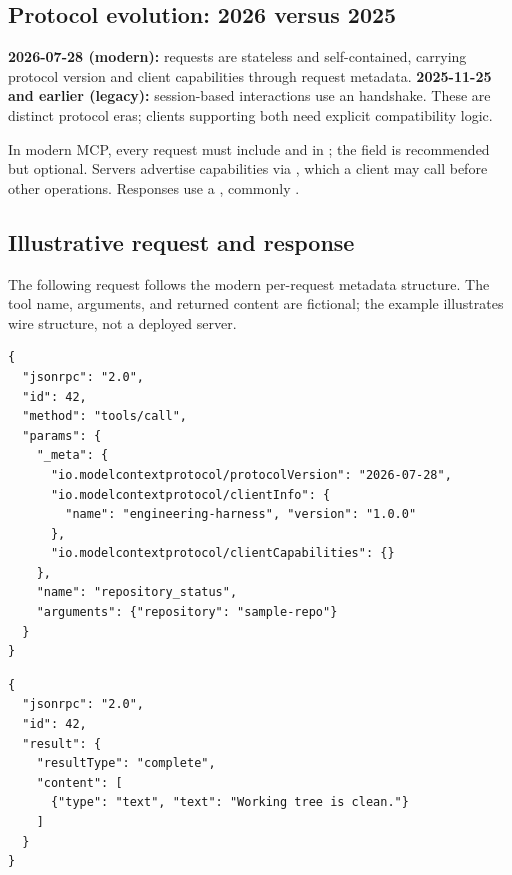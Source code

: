 \documentclass[11pt,letterpaper]{article}
\begin{document}
\subsection{Protocol evolution: 2026 versus 2025}
\begin{tipbox}
\textbf{2026-07-28 (modern):} requests are stateless and self-contained, carrying protocol version and client capabilities through request metadata. \textbf{2025-11-25 and earlier (legacy):} session-based interactions use an  handshake. These are distinct protocol eras; clients supporting both need explicit compatibility logic.\cite{mcpversion}
\end{tipbox}

In modern MCP, every request must include  and  in ; the  field is recommended but optional. Servers advertise capabilities via , which a client may call before other operations. Responses use a , commonly .\cite{mcpbase,mcpversion}

\subsection{Illustrative request and response}
The following  request follows the modern per-request metadata structure. The tool name, arguments, and returned content are fictional; the example illustrates wire structure, not a deployed server.\cite{mcptools,mcpbase}
\par\smallskip{}\par
\begin{verbatim}
{
  "jsonrpc": "2.0",
  "id": 42,
  "method": "tools/call",
  "params": {
    "_meta": {
      "io.modelcontextprotocol/protocolVersion": "2026-07-28",
      "io.modelcontextprotocol/clientInfo": {
        "name": "engineering-harness", "version": "1.0.0"
      },
      "io.modelcontextprotocol/clientCapabilities": {}
    },
    "name": "repository_status",
    "arguments": {"repository": "sample-repo"}
  }
}
\end{verbatim}
\par\smallskip{}\par
\begin{verbatim}
{
  "jsonrpc": "2.0",
  "id": 42,
  "result": {
    "resultType": "complete",
    "content": [
      {"type": "text", "text": "Working tree is clean."}
    ]
  }
}
\end{verbatim}
\end{document}
